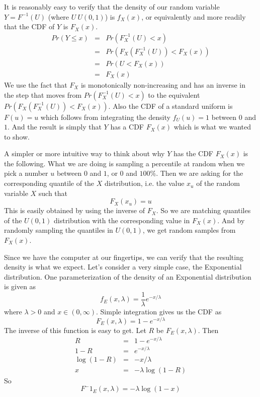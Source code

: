\documentclass{article}
\begin{document}
It is reasonably easy to verify that the density of our random
variable $Y = F^{-1}(U)$ (where $U ~ U(0,1 )$) is $f_X(x)$, or
equivalently and more readily that the CDF of $Y$ is $F_X(x)$.
\begin{eqnarray*}
 Pr(Y \le x)  &=& Pr(F_X^{-1}(U) < x) \\
  &=& Pr(F_X(F_X^{-1}(U)) < F_X(x)) \\
  &=& Pr(U < F_X(x)) \\
  &=& F_X(x)
\end{eqnarray*}
We use the fact that $F_X$ is monotonically non-increasing and has an
inverse in the step that moves from $Pr(F_X^{-1}(U) < x)$ to the
equivalent $Pr(F_X(F_X^{-1}(U)) < F_X(x))$.  
Also the CDF of a standard uniform is  $F(u) = u$
which follows from integrating the density $f_U(u) = 1$ between
$0$ and $1$.
And the result is simply
that $Y$ has a CDF $F_X(x)$ which is what we wanted to show.

A simpler or more intuitive way to think about why $Y$ has the CDF
$F_X(x)$ is the following.  What we are doing is sampling a percentile
at random when we pick a number $u$ between $0$ and $1$, or $0$ and
$100\%$.
Then we are asking for the corresponding quantile of
the $X$ distribution, i.e. the value $x_u$ of the random
 variable $X$ such that 
 $$F_X( x_u) = u$$ This is easily obtained by using the inverse of
 $F_X$.  So we are matching quantiles of the $U(0, 1)$ distribution
 with the corresponding value in $F_X(x)$.  And by randomly sampling
 the quantiles in $U(0, 1)$, we get random samples from $F_X(x)$.


Since we have the computer at our fingertips, we can verify that the
resulting density is what we expect.  Let's consider a very simple
case, the Exponential distribution.
One parameterization of the density of an Exponential distribution is given as
$$ f_E(x, \lambda) = \frac{1}{\lambda}e^{-x/\lambda}$$ where $\lambda
> 0$ and $x \in (0, \infty)$.
Simple integration gives us the CDF as
$$ F_E(x, \lambda) = 1 - e^{-x/\lambda}$$
The inverse of this function is easy to get.
Let $R$ be $F_E(x, \lambda)$.
Then 
\begin{eqnarray*}
  R &=& 1 - e^{-x/\lambda} \\
  1-R &=& e^{-x/\lambda} \\
  \log(1 - R) &=& -x/\lambda \\
  x &=&  -\lambda \log(1 - R)
\end{eqnarray*}
So 
$$ F^-1_E(x, \lambda) = -\lambda \log(1 - x)$$


\end{document}
